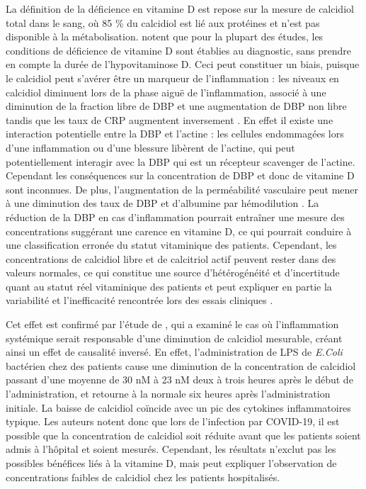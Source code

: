 \documentclass[
  a4paper,
  DIV=11,
  numbers=noendperiod,
  listof=totoc]{scrreprt}
\begin{document}
La définition de la déficience en vitamine D est repose sur la mesure de
calcidiol total dans le sang, où 85 \% du calcidiol est lié aux
protéines et n'est pas disponible à la métabolisation.
\textcite{Crafa.2021} notent que pour la plupart des études, les
conditions de déficience de vitamine D sont établies au diagnostic, sans
prendre en compte la durée de l'hypovitaminose D. Ceci peut constituer
un biais, puisque le calcidiol peut s'avérer être un marqueur de
l'inflammation : les niveaux en calcidiol diminuent lors de la phase
aiguë de l'inflammation, associé à une diminution de la fraction libre
de \ac{DBP} et une augmentation de \ac{DBP} non libre tandis que les
taux de \ac{CRP} augmentent inversement \autocite{Silva.2015}. En effet
il existe une interaction potentielle entre la \ac{DBP} et l'actine :
les cellules endommagées lors d'une inflammation ou d'une blessure
libèrent de l'actine, qui peut potentiellement interagir avec la
\ac{DBP} qui est un récepteur scavenger de l'actine. Cependant les
conséquences sur la concentration de \ac{DBP} et donc de vitamine D sont
inconnues. De plus, l'augmentation de la perméabilité vasculaire peut
mener à une diminution des taux de DBP et d'albumine par hémodilution
\autocite{Reijven.2020,Silva.2015}. La réduction de la \ac{DBP} en cas
d'inflammation pourrait entraîner une mesure des concentrations
suggérant une carence en vitamine D, ce qui pourrait conduire à une
classification erronée du statut vitaminique des patients. Cependant,
les concentrations de calcidiol libre et de calcitriol actif peuvent
rester dans des valeurs normales, ce qui constitue une source
d'hétérogénéité et d'incertitude quant au statut réel vitaminique des
patients et peut expliquer en partie la variabilité et l'inefficacité
rencontrée lors des essais cliniques \autocite{Reijven.2020}.

Cet effet est confirmé par l'étude de \textcite{Smolders.2021}, qui a
examiné le cas où l'inflammation systémique serait responsable d'une
diminution de calcidiol mesurable, créant ainsi un effet de causalité
inversé. En effet, l'administration de \ac{LPS} de \emph{E.Coli}
bactérien chez des patients cause une diminution de la concentration de
calcidiol passant d'une moyenne de 30 nM à 23 nM deux à trois heures
après le début de l'administration, et retourne à la normale six heures
après l'administration initiale. La baisse de calcidiol coïncide avec un
pic des cytokines inflammatoires typique. Les auteurs notent donc que
lors de l'infection par COVID-19, il est possible que la concentration
de calcidiol soit réduite avant que les patients soient admis à
l'hôpital et soient mesurés. Cependant, les résultats n'exclut pas les
possibles bénéfices liés à la vitamine D, mais peut expliquer
l'observation de concentrations faibles de calcidiol chez les patients
hospitalisés.
\end{document}
